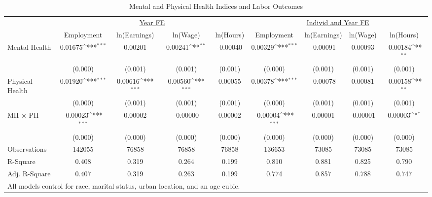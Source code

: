 \def\sym#1{\ifmmode^{#1}\else\(^{#1}\)\fi}
\begin{table}
\center\caption*{Mental and Physical Health Indices and Labor Outcomes}
\footnotesize
\begin{tabular}{l*{8}{c}}
                    &\multicolumn{4}{c}{\underline{Year FE}}                                                &\multicolumn{4}{c}{\underline{Individ and Year FE}}                                    \\\cmidrule(lr){2-5}\cmidrule(lr){6-9}
                    &\multicolumn{1}{c}{Employment}&\multicolumn{1}{c}{ln(Earnings)}&\multicolumn{1}{c}{ln(Wage)}&\multicolumn{1}{c}{ln(Hours)}&\multicolumn{1}{c}{Employment}&\multicolumn{1}{c}{ln(Earnings)}&\multicolumn{1}{c}{ln(Wage)}&\multicolumn{1}{c}{ln(Hours)}\\
\midrule
Mental Health       &     0.01675\sym{***}&     0.00201         &     0.00241\sym{**} &    -0.00040         &     0.00329\sym{***}&    -0.00091         &     0.00093         &    -0.00184\sym{**} \\
                    &     (0.000)         &     (0.001)         &     (0.001)         &     (0.001)         &     (0.000)         &     (0.001)         &     (0.001)         &     (0.001)         \\
Physical Health     &     0.01920\sym{***}&     0.00616\sym{***}&     0.00560\sym{***}&     0.00055         &     0.00378\sym{***}&    -0.00078         &     0.00081         &    -0.00158\sym{**} \\
                    &     (0.000)         &     (0.001)         &     (0.001)         &     (0.001)         &     (0.000)         &     (0.001)         &     (0.001)         &     (0.001)         \\
MH $\times$ PH      &    -0.00023\sym{***}&     0.00002         &    -0.00000         &     0.00002         &    -0.00004\sym{***}&     0.00001         &    -0.00001         &     0.00003\sym{*}  \\
                    &     (0.000)         &     (0.000)         &     (0.000)         &     (0.000)         &     (0.000)         &     (0.000)         &     (0.000)         &     (0.000)         \\
\midrule
Observations        &      142055         &       76858         &       76858         &       76858         &      136653         &       73085         &       73085         &       73085         \\
R-Square            &       0.408         &       0.319         &       0.264         &       0.199         &       0.810         &       0.881         &       0.825         &       0.790         \\
Adj. R-Square       &       0.407         &       0.319         &       0.263         &       0.199         &       0.774         &       0.857         &       0.788         &       0.747         \\
\bottomrule
\multicolumn{9}{l}{\small{All models control for race, marital status, urban location, and an age cubic.}} \\
\end{tabular}
\end{table}
